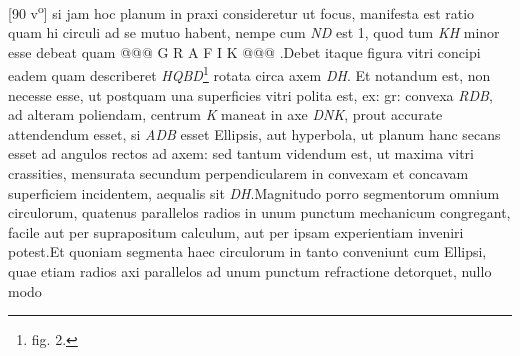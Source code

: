 [90 v\textsuperscript{o}]  si jam hoc planum in praxi consideretur ut focus\protect{}, manifesta est  ratio quam hi circuli ad se mutuo habent, nempe cum \textit{ND}  est 1, quod tum \textit{KH} minor esse debeat quam @@@ G R A F I K @@@%
                    .\pend \pstart  Debet itaque figura vitri concipi eadem quam describeret \textit{HQBD}\footnote{fig. 2.} rotata circa axem \textit{DH}. Et notandum est, non  necesse esse, ut postquam una superficies vitri polita est, ex:  gr: convexa \textit{RDB}, ad alteram poliendam, centrum \textit{K} maneat  in axe \textit{DNK}, prout accurate attendendum esset, si \textit{ADB}  esset Ellipsis, aut hyperbola, ut planum hanc secans esset  ad angulos rectos ad axem: sed tantum videndum est, ut  maxima vitri crassities, mensurata secundum perpendicularem  in convexam et concavam superficiem incidentem, aequalis  sit \textit{DH}.\pend \pstart  Magnitudo porro segmentorum omnium circulorum,  quatenus parallelos radios in unum punctum mechanicum\protect{}  congregant, facile aut per suprapositum calculum, aut  per ipsam experientiam inveniri potest.\pend \pstart  Et quoniam segmenta haec circulorum in tanto conveniunt cum Ellipsi, quae etiam radios axi parallelos  ad unum punctum refractione detorquet, nullo modo 